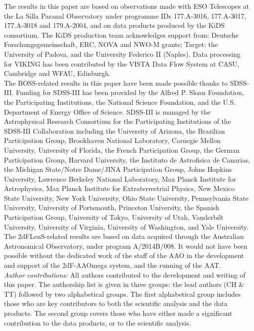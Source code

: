 \documentclass{aa}
\begin{document}
\begin{acknowledgements}
%
The results in this paper are based on observations made with ESO Telescopes at the La Silla Paranal Observatory under programme IDs 177.A-3016, 177.A-3017, 177.A-3018 and 179.A-2004, and on data products produced by the KiDS consortium. The KiDS production team acknowledges support from: Deutsche Forschungsgemeinschaft, ERC, NOVA and NWO-M grants; Target; the University of Padova, and the University Federico II (Naples).  Data processing for VIKING has been contributed by the VISTA Data Flow System at CASU, Cambridge and WFAU, Edinburgh. \\

The BOSS-related results in this paper have been made possible thanks to SDSS-III. Funding for SDSS-III has been provided by the Alfred P. Sloan Foundation, the Participating Institutions, the National Science Foundation, and the U.S. Department of Energy Office of Science.   SDSS-III is managed by the Astrophysical Research Consortium for the Participating Institutions of the SDSS-III Collaboration including the University of Arizona, the Brazilian Participation Group, Brookhaven National Laboratory, Carnegie Mellon University, University of Florida, the French Participation Group, the German Participation Group, Harvard University, the Instituto de Astrofisica de Canarias, the Michigan State/Notre Dame/JINA Participation Group, Johns Hopkins University, Lawrence Berkeley National Laboratory, Max Planck Institute for Astrophysics, Max Planck Institute for Extraterrestrial Physics, New Mexico State University, New York University, Ohio State University, Pennsylvania State University, University of Portsmouth, Princeton University, the Spanish Participation Group, University of Tokyo, University of Utah, Vanderbilt University, University of Virginia, University of Washington, and Yale University.\\

The 2dFLenS-related results are based on data acquired through the Australian Astronomical Observatory, under program A/2014B/008. It would not have been possible without the dedicated work of the staff of the AAO in the development and support of the 2dF-AAOmega system, and the running of the AAT.\\

{ {\it Author contributions:}  All authors contributed to the development and writing of this paper.  The authorship list is given in three groups:  the lead authors (CH \& TT) followed by two alphabetical groups.  The first alphabetical group includes those who are key contributors to both the scientific analysis and the data products.  The second group covers those who have either made a significant contribution to the data products, or to the scientific analysis.}
\end{acknowledgements}






\end{document}
